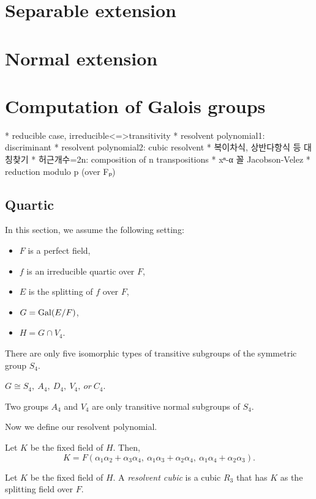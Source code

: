 \documentclass{../exp}
\begin{document}
\section{Separable extension}









\section{Normal extension}







\section{Computation of Galois groups}

 * reducible case, irreducible<=>transitivity
 * resolvent polynomial1: discriminant
 * resolvent polynomial2: cubic resolvent
 * 복이차식, 상반다항식 등 대칭찾기
 * 허근개수=2n: composition of n transpositions
 * xⁿ-α 꼴  Jacobson-Velez
 * reduction modulo p (over Fₚ)

\subsection{Quartic}
In this section, we assume the following setting:
\begin{itemize}
\item $F$ is a perfect field, %
\item $f$ is an irreducible quartic over $F$,
\item $E$ is the splitting of $f$ over $F$,
\item $G=\operatorname{Gal}(E/F)$,
\item $H=G\cap V_4$. 
\end{itemize}
\begin{thm}
There are only five isomorphic types of transitive subgroups of the symmetric group $S_4$.
\end{thm}
\begin{cor}
$G\cong S_4,\ A_4,\ D_4,\ V_4,\ or\ C_4$.
\end{cor}
\begin{prop}
Two groups $A_4$ and $V_4$ are only transitive normal subgroups of $S_4$.
\end{prop}

Now we define our resolvent polynomial.
\begin{prop}
Let $K$ be the fixed field of $H$.
Then,
\[K=F(\alpha_1\alpha_2+\alpha_3\alpha_4,\ \alpha_1\alpha_3+\alpha_2\alpha_4,\ \alpha_1\alpha_4+\alpha_2\alpha_3).\]
\end{prop}
\begin{defn}
Let $K$ be the fixed field of $H$.
A \emph{resolvent cubic} is a cubic $R_3$ that has $K$ as the splitting field over $F$.
\end{defn}
\end{document}

